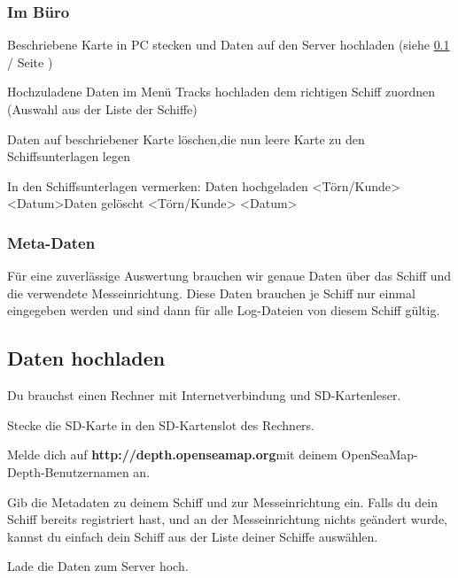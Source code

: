 \documentclass[pdftex, 8pt, paper=130mm:92mm,pagesize]{scrartcl}
\begin{document}
\subsubsection{Im Büro}

\begin{compactenum}
\item Beschriebene Karte in PC stecken und Daten auf den Server hochladen \newline(siehe \ref{sec:upload}  / Seite \pageref{sec:upload}) 
\item Hochzuladene Daten im Menü \glqq Tracks hochladen\grqq{} dem richtigen Schiff zuordnen (Auswahl aus der Liste der Schiffe) 
\item Daten auf beschriebener Karte löschen,\newline die nun leere Karte zu den Schiffsunterlagen legen 
\item In den Schiffsunterlagen vermerken: \newline Daten hochgeladen <Törn/Kunde> <Datum>\newline Daten gelöscht <Törn/Kunde> <Datum>
\end{compactenum}


\subsubsection{Meta-Daten}

Für eine zuverlässige Auswertung brauchen wir genaue Daten über das Schiff und die verwendete Messeinrichtung. Diese Daten brauchen je Schiff nur einmal eingegeben werden und sind dann für alle Log-Dateien von diesem Schiff gültig. 


\subsection{Daten hochladen}\label{sec:upload}

\begin{compactenum}
\item Du brauchst einen Rechner mit Internetverbindung und SD-Kartenleser.
\item Stecke die SD-Karte in den SD-Kartenslot des Rechners. 
\item Melde dich auf \textbf{http://depth.openseamap.org}\newline mit deinem OpenSeaMap-Depth-Benutzernamen an. 
\item Gib die Metadaten zu deinem Schiff und zur Messeinrichtung ein. Falls du dein Schiff bereits registriert hast, und an der Messeinrichtung nichts geändert wurde, kannst du einfach dein Schiff aus der Liste deiner Schiffe auswählen.
\item Lade die Daten zum Server hoch.
\end{compactenum}
\end{document}
